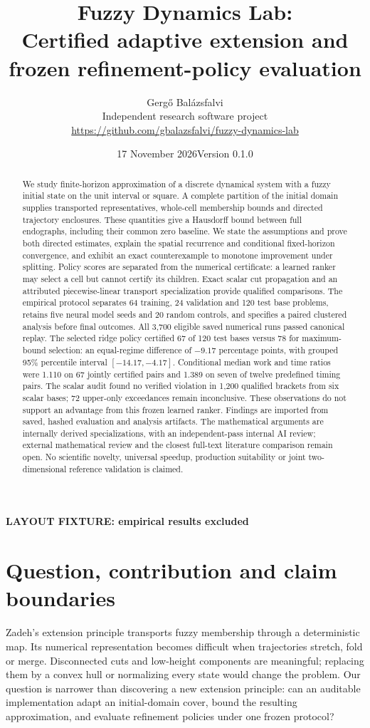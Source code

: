 \documentclass[10pt,a4paper]{article}
\title{Fuzzy Dynamics Lab:\\Certified adaptive extension and\\frozen refinement-policy evaluation}
\author{Gergő Balázsfalvi\\\small Independent research software project\\\small\url{https://github.com/gbalazsfalvi/fuzzy-dynamics-lab}}
\date{17 November 2026\quad\textbar\quad Version 0.1.0}
\newcommand{\StudyStatus}{LAYOUT FIXTURE: empirical results excluded}
\newcommand{\StudyStatus}{Research software report; internally reviewed, not peer reviewed}
\begin{document}
\maketitle
\begin{center}\small\textbf{\StudyStatus}\end{center}
\begin{abstract}
We study finite-horizon approximation of a discrete dynamical system with a
fuzzy initial state on the unit interval or square. A complete partition of
the initial domain supplies transported representatives, whole-cell membership
bounds and directed trajectory enclosures. These quantities give a Hausdorff
bound between full endographs, including their common zero baseline. We state
the assumptions and prove both directed estimates, explain the spatial
recurrence and conditional fixed-horizon convergence, and exhibit an exact
counterexample to monotone improvement under splitting. Policy scores are
separated from the numerical certificate: a learned ranker may select a cell
but cannot certify its children. Exact scalar cut propagation and an attributed
piecewise-linear transport specialization provide qualified comparisons.
The empirical protocol separates 64 training, 24 validation and 120 test base
problems, retains five neural model seeds and 20 random controls, and specifies
a paired clustered analysis before final outcomes. All 3,700 eligible saved
numerical runs passed canonical replay. The selected ridge policy certified
67 of 120 test bases versus 78 for maximum-bound selection: an equal-regime
difference of $-9.17$ percentage points, with grouped 95\% percentile interval
$[-14.17,-4.17]$. Conditional median work and time ratios were 1.110 on 67
jointly certified pairs and 1.389 on seven of twelve predefined timing pairs.
The scalar audit found no verified violation in 1,200 qualified brackets
from six scalar bases;
72 upper-only exceedances remain inconclusive. These observations do not
support an advantage from this frozen learned ranker. Findings are imported
from saved, hashed evaluation and analysis artifacts. The
mathematical arguments are internally derived specializations, with an
independent-pass internal AI review; external mathematical review and the
closest full-text literature comparison remain open. No scientific novelty,
universal speedup, production suitability or joint two-dimensional reference
validation is claimed.
\end{abstract}
\clearpage

\section{Question, contribution and claim boundaries}
Zadeh's extension principle transports fuzzy membership through a deterministic
map. Its numerical representation becomes difficult when trajectories stretch,
fold or merge. Disconnected cuts and low-height components are meaningful;
replacing them by a convex hull or normalizing every state would change the
problem. Our question is narrower than discovering a new extension principle:
can an auditable implementation adapt an initial-domain cover, bound the
resulting approximation, and evaluate refinement policies under one frozen
protocol?
\end{document}
